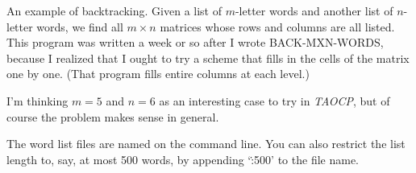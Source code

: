 
\srcloctrue

An example of backtracking. Given a list of
$m$-letter words and another
list of $n$-letter words, we find all $m\times n$ matrices whose rows and
columns are all listed. This program was written a week or so after I wrote
{\mc BACK-MXN-WORDS}, because I realized that I ought to try a scheme
that fills in the cells of the matrix one by one. (That program
fills entire columns at each level.)

I'm thinking $m=5$ and $n=6$ as an interesting case to try in {\sl TAOCP},
but of course the problem makes sense in general.

The word list files are named on the command line. You can also restrict
the list length to, say, at most 500 words, by appending `\.{:500}' to
the file name.

